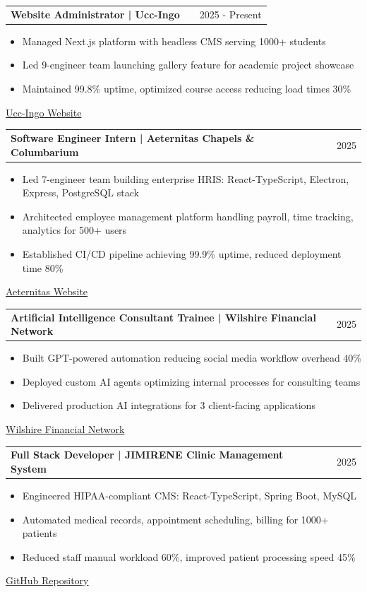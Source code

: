 \documentclass[a4paper,12pt]{article}
\makeatletter
\newenvironment{joblong}[2]
    {
    \begin{tabularx}{\linewidth}{@{}l X r@{}}
    \textbf{#1} & \hfill &  #2 \\[3.75pt]
    \end{tabularx}
    \begin{minipage}[t]{\linewidth}
    \begin{itemize}[nosep,after=\strut, leftmargin=1em, itemsep=3pt,label=--]
    }
    {
    \end{itemize}
    \end{minipage}    
    }
\makeatother
\begin{document}
\begin{joblong}{Website Administrator | Ucc-Ingo}{2025 - Present}
\item Managed Next.js platform with headless CMS serving 1000+ students
\item Led 9-engineer team launching gallery feature for academic project showcase
\item Maintained 99.8\% uptime, optimized course access reducing load times 30\%
\end{joblong}
\href{https://uccingo.tech/}{Ucc-Ingo Website}

\begin{joblong}{Software Engineer Intern | Aeternitas Chapels \& Columbarium}{2025}
\item Led 7-engineer team building enterprise HRIS: React-TypeScript, Electron, Express, PostgreSQL stack
\item Architected employee management platform handling payroll, time tracking, analytics for 500+ users
\item Established CI/CD pipeline achieving 99.9\% uptime, reduced deployment time 80\%
\end{joblong}
\href{https://aeternitas.ph/}{Aeternitas Website}

\begin{joblong}{Artificial Intelligence Consultant Trainee | Wilshire Financial Network}{2025}
\item Built GPT-powered automation reducing social media workflow overhead 40\%
\item Deployed custom AI agents optimizing internal processes for consulting teams
\item Delivered production AI integrations for 3 client-facing applications
\end{joblong}
\href{https://www.wilshirefinancialnetwork.net/}{Wilshire Financial Network}

\begin{joblong}{Full Stack Developer | JIMIRENE Clinic Management System}{2025}
\item Engineered HIPAA-compliant CMS: React-TypeScript, Spring Boot, MySQL
\item Automated medical records, appointment scheduling, billing for 1000+ patients
\item Reduced staff manual workload 60\%, improved patient processing speed 45\%
\end{joblong}
\href{https://github.com/Genrei123/clinic-management-system}{GitHub Repository}
\end{document}
